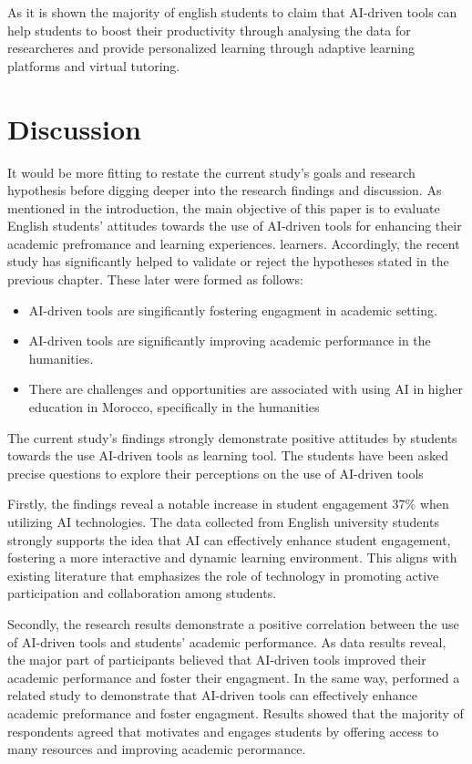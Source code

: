 As it is shown the majority of english students to claim that AI-driven tools can
help students to boost their productivity through analysing the data for researcheres
and provide personalized learning through adaptive learning platforms and virtual tutoring.

\section{Discussion}
It would be more fitting to restate the current study’s goals and research hypothesis
before digging deeper into the research findings and discussion. As mentioned in the
introduction, the main objective of this paper is to evaluate English students’ attitudes towards the
use of AI-driven tools for enhancing their academic prefromance and learning experiences.
learners. Accordingly, the recent study has significantly helped
to validate or reject the hypotheses stated in the previous chapter.
These later were formed as follows:
\begin{itemize}
	\item AI-driven tools are singificantly fostering engagment in academic setting.
	\item AI-driven tools are significantly improving academic performance in the humanities.
	\item There are challenges and opportunities are associated with using AI in higher education
	      in Morocco, specifically in the humanities
\end{itemize}
The current study’s findings strongly demonstrate positive attitudes by students towards
the use AI-driven tools as learning tool. The students have been asked precise questions
to explore their perceptions on the use of AI-driven tools

Firstly, the findings reveal a notable increase in student engagement 37\% when 
utilizing AI technologies. The data collected from English university students
strongly supports the idea that AI can effectively enhance student engagement,
fostering a more interactive and dynamic learning environment. This aligns with
existing literature that emphasizes the role of technology in promoting active
participation and collaboration among students.

Secondly, the research results demonstrate a positive correlation between the use of AI-driven tools and students' academic performance. 
As data results reveal, the major part of participants believed that AI-driven tools
improved their academic performance and foster their engagment. In the same way, 
\citep{mohammed_exploring_2023} performed a related study
to demonstrate that AI-driven tools can effectively enhance 
academic preformance and foster engagment. Results showed
that the majority of respondents agreed that  
motivates and engages students by offering access to 
many resources and improving academic perormance. 

